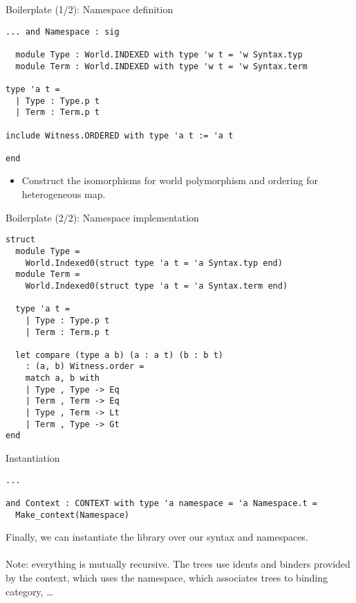 \documentclass{beamer}          %
\begin{document}
\begin{frame}[fragile]{Boilerplate (1/2): Namespace definition}

\begin{lstlisting}[xleftmargin=-0.2in]
... and Namespace : sig

  module Type : World.INDEXED with type 'w t = 'w Syntax.typ
  module Term : World.INDEXED with type 'w t = 'w Syntax.term

type 'a t =
  | Type : Type.p t
  | Term : Term.p t

include Witness.ORDERED with type 'a t := 'a t

end
\end{lstlisting}

\begin{itemize}
  \item Construct the isomorphisms for world polymorphism and ordering for heterogeneous map.
\end{itemize}
\end{frame}

\begin{frame}[fragile]{Boilerplate (2/2): Namespace implementation}

\begin{lstlisting}[xleftmargin=-0.2in]
struct
  module Type =
    World.Indexed0(struct type 'a t = 'a Syntax.typ end)
  module Term =
    World.Indexed0(struct type 'a t = 'a Syntax.term end)

  type 'a t =
    | Type : Type.p t
    | Term : Term.p t

  let compare (type a b) (a : a t) (b : b t)
    : (a, b) Witness.order =
    match a, b with
    | Type , Type -> Eq
    | Term , Term -> Eq
    | Type , Term -> Lt
    | Term , Type -> Gt
end
\end{lstlisting}

\end{frame}

\begin{frame}[fragile]{Instantiation}

\begin{lstlisting}
...

and Context : CONTEXT with type 'a namespace = 'a Namespace.t =
  Make_context(Namespace)
\end{lstlisting}

Finally, we can instantiate the library over our syntax and namespaces. \\~\\

Note: everything is mutually recursive. The trees use idents and binders provided by the context, which uses the namespace, which associates trees to binding category, \ldots

\end{frame}
\end{document}
